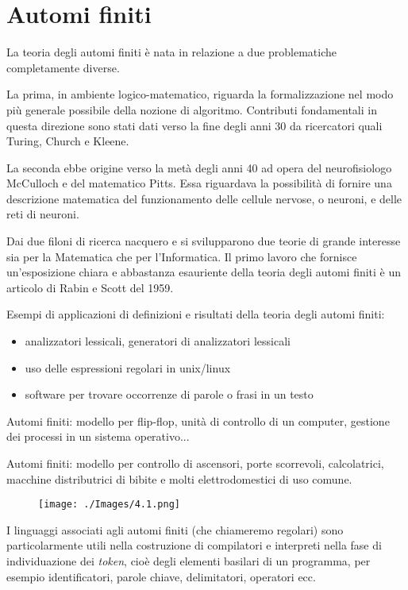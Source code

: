 \chapter{Automi finiti}
La teoria degli automi ﬁniti è nata in relazione a due problematiche completamente diverse.

La prima, in ambiente logico-matematico, riguarda la formalizzazione nel modo più generale possibile della nozione di algoritmo. Contributi fondamentali in questa direzione sono stati dati verso la ﬁne degli anni 30 da ricercatori quali Turing, Church e Kleene.

La seconda ebbe origine verso la metà degli anni 40 ad opera del neuroﬁsiologo McCulloch e del matematico Pitts. Essa riguardava la possibilità di fornire una descrizione matematica del funzionamento delle cellule nervose, o neuroni, e delle reti di neuroni.

\vspace{5mm}

Dai due ﬁloni di ricerca nacquero e si svilupparono due teorie di grande interesse sia per la Matematica che per l’Informatica.
Il primo lavoro che fornisce un’esposizione chiara e abbastanza esauriente della teoria degli automi ﬁniti è un articolo di Rabin e Scott del 1959.

\vspace{5mm}

Esempi di applicazioni di deﬁnizioni e risultati della teoria degli automi ﬁniti:
\begin{itemize}
    \item analizzatori lessicali, generatori di analizzatori lessicali
    \item uso delle espressioni regolari in unix/linux
    \item software per trovare occorrenze di parole o frasi in un testo
\end{itemize}
Automi ﬁniti: modello per ﬂip-ﬂop, unità di controllo di un computer, gestione dei processi in un sistema operativo...

Automi ﬁniti: modello per controllo di ascensori, porte scorrevoli, calcolatrici, macchine distributrici di bibite e molti elettrodomestici di uso comune.

\begin{figure}[hbpt!]
    \centering
    \texttt{[image: ./Images/4.1.png]}
\end{figure}
\FloatBarrier

I linguaggi associati agli automi ﬁniti (che chiameremo regolari) sono particolarmente utili nella costruzione di compilatori e interpreti nella fase di individuazione dei \textit{token}, cioè degli elementi basilari di un programma, per esempio identiﬁcatori, parole chiave, delimitatori, operatori ecc.

